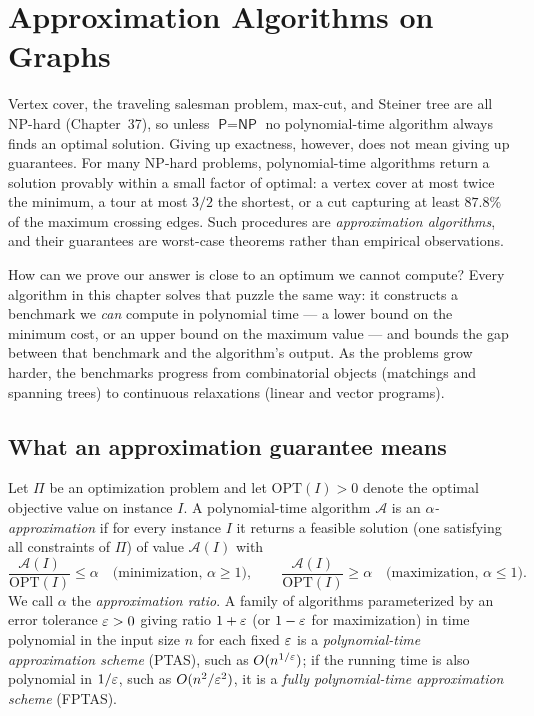 \chapter{Approximation Algorithms on Graphs}
\label{ch:approximation}

Vertex cover, the traveling salesman problem, max-cut, and Steiner tree are all \textsf{NP}-hard
(Chapter~37), so unless $\textsf{P}=\textsf{NP}$ no polynomial-time algorithm always finds an optimal
solution. Giving up exactness, however, does not mean giving up guarantees. For many \textsf{NP}-hard
problems, polynomial-time algorithms return a solution provably within a small factor of optimal: a
vertex cover at most twice the minimum, a tour at most $3/2$ the shortest, or a cut capturing at least
$87.8\%$ of the maximum crossing edges. Such procedures are \emph{approximation algorithms}, and their
guarantees are worst-case theorems rather than empirical observations.

How can we prove our answer is close to an optimum we cannot compute? Every algorithm in this chapter
solves that puzzle the same way: it constructs a benchmark we \emph{can} compute in polynomial time ---
a lower bound on the minimum cost, or an upper bound on the maximum value --- and bounds the gap
between that benchmark and the algorithm's output. As the problems grow harder, the benchmarks progress
from combinatorial objects (matchings and spanning trees) to continuous relaxations (linear and vector
programs).

\chapterline

\section{What an approximation guarantee means}

\begin{definition}\label{ch38:def-ratio}
Let $\Pi$ be an optimization problem and let $\mathrm{OPT}(I) > 0$ denote the optimal objective value on
instance $I$. A polynomial-time algorithm $\mathcal{A}$ is an \emph{$\alpha$-approximation} if for
every instance $I$ it returns a feasible solution (one satisfying all constraints of $\Pi$) of value $\mathcal{A}(I)$ with
\[
  \frac{\mathcal{A}(I)}{\mathrm{OPT}(I)} \le \alpha \quad\text{(minimization, } \alpha\ge 1\text{)},
  \qquad
  \frac{\mathcal{A}(I)}{\mathrm{OPT}(I)} \ge \alpha \quad\text{(maximization, } \alpha\le 1\text{)}.
\]
We call $\alpha$ the \emph{approximation ratio}. A family of algorithms parameterized by an error tolerance $\varepsilon>0$
giving ratio $1+\varepsilon$ (or $1-\varepsilon$ for maximization) in time polynomial in the input size $n$ for each fixed $\varepsilon$ is a
\emph{polynomial-time approximation scheme} (PTAS), such as $O(n^{1/\varepsilon})$; if the running time is also polynomial in
$1/\varepsilon$, such as $O(n^2/\varepsilon^2)$, it is a \emph{fully polynomial-time approximation scheme} (FPTAS).
\end{definition}

